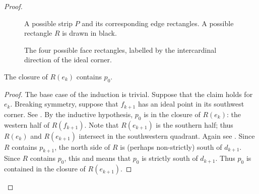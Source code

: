 \documentclass[12pt]{amsart}
\begin{document}
\begin{proof}
\begin{figure}[htbp]
\caption{A possible strip $P$ and its corresponding edge rectangles.  A possible rectangle $R$ is drawn in black.}
\label{Fig:RedStripRectangles}
\end{figure}

\begin{figure}[htbp]
\qquad
{}

\qquad
{}

\caption{The four possible face rectangles, labelled by the intercardinal direction of the ideal corner.}
\label{Fig:FourFaces}
\end{figure}

\begin{claim*}
The closure of $R(e_k)$ contains $p_0$.
\end{claim*}

\begin{proof}
The base case of the induction is trivial.  Suppose that the claim holds for $e_k$.  Breaking symmetry, suppose that $f_{k+1}$ has an ideal point in its southwest corner.  See . By the inductive hypothesis, $p_0$ is in the closure of $R(e_k)$: the western half of $R(f_{k+1})$. Note that $R(e_{k+1})$ is the southern half; thus $R(e_{k})$ and $R(e_{k+1})$ intersect in the southwestern quadrant. Again see . Since $R$ contains $p_{k+1}$, the north side of $R$ is (perhaps non-strictly) south of $d_{k+1}$.  Since $R$ contains $p_0$, this and  means that $p_0$ is strictly south of $d_{k+1}$.  Thus $p_0$ is contained in the closure of $R(e_{k+1})$.
\end{proof}


\end{proof}
\end{document}
